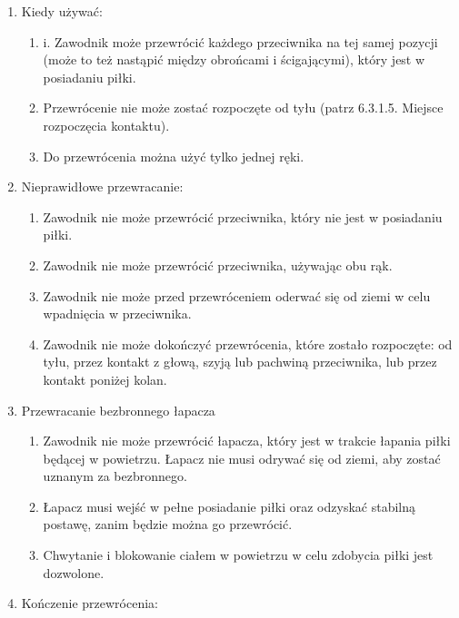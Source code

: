 \documentclass[12pt]{article}
\begin{document}
\begin{enumerate}
	\item
	      Kiedy używać:

	      \begin{enumerate}
		      \item
		            i. Zawodnik może przewrócić każdego przeciwnika na tej samej pozycji
		            (może to też nastąpić między obrońcami i ścigającymi), który jest w
		            posiadaniu piłki.
		      \item
		            Przewrócenie nie może zostać rozpoczęte od tyłu (patrz 6.3.1.5.
		            Miejsce rozpoczęcia kontaktu).
		      \item
		            Do przewrócenia można użyć tylko jednej ręki.
	      \end{enumerate}
	\item
	      Nieprawidłowe przewracanie:

	      \begin{enumerate}
		      \item
		            Zawodnik nie może przewrócić przeciwnika, który nie jest w
		            posiadaniu piłki.
		      \item
		            Zawodnik nie może przewrócić przeciwnika, używając obu rąk.
		      \item
		            Zawodnik nie może przed przewróceniem oderwać się od ziemi w celu
		            wpadnięcia w przeciwnika.
		      \item
		            Zawodnik nie może dokończyć przewrócenia, które zostało rozpoczęte:
		            od tyłu, przez kontakt z głową, szyją lub pachwiną przeciwnika, lub
		            przez kontakt poniżej kolan.
	      \end{enumerate}
	\item
	      Przewracanie bezbronnego łapacza

	      \begin{enumerate}
		      \item
		            Zawodnik nie może przewrócić łapacza, który jest w trakcie łapania
		            piłki będącej w powietrzu. Łapacz nie musi odrywać się od ziemi, aby
		            zostać uznanym za bezbronnego.
		      \item
		            Łapacz musi wejść w pełne posiadanie piłki oraz odzyskać stabilną
		            postawę, zanim będzie można go przewrócić.
		      \item
		            Chwytanie i blokowanie ciałem w powietrzu w celu zdobycia piłki jest
		            dozwolone.
	      \end{enumerate}
	\item
	      Kończenie przewrócenia:


\end{enumerate}
\end{document}
